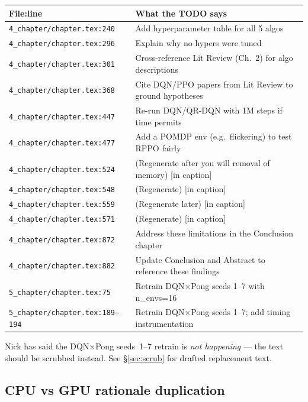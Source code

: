 \documentclass[11pt,a4paper]{article}
\newcommand{\fileline}[1]{\texttt{\small #1}}
\begin{document}
\begin{longtable}{p{4.5cm}p{9.5cm}}
\toprule
File:line & What the TODO says \\
\midrule
\fileline{4\_chapter/chapter.tex:240} & Add hyperparameter table for all 5 algos \\
\fileline{4\_chapter/chapter.tex:296} & Explain why no hypers were tuned \\
\fileline{4\_chapter/chapter.tex:301} & Cross-reference Lit Review (Ch.~2) for algo descriptions \\
\fileline{4\_chapter/chapter.tex:368} & Cite DQN/PPO papers from Lit Review to ground hypotheses \\
\fileline{4\_chapter/chapter.tex:447} & Re-run DQN/QR-DQN with 1M steps if time permits \\
\fileline{4\_chapter/chapter.tex:477} & Add a POMDP env (e.g.~flickering) to test RPPO fairly \\
\fileline{4\_chapter/chapter.tex:524} & (Regenerate after you will removal of memory) [in caption] \\
\fileline{4\_chapter/chapter.tex:548} & (Regenerate) [in caption] \\
\fileline{4\_chapter/chapter.tex:559} & (Regenerate later) [in caption] \\
\fileline{4\_chapter/chapter.tex:571} & (Regenerate) [in caption] \\
\fileline{4\_chapter/chapter.tex:872} & Address these limitations in the Conclusion chapter \\
\fileline{4\_chapter/chapter.tex:882} & Update Conclusion and Abstract to reference these findings \\
\fileline{5\_chapter/chapter.tex:75}  & Retrain DQN$\times$Pong seeds 1--7 with n\_envs=16 \\
\fileline{5\_chapter/chapter.tex:189--194} & Retrain DQN$\times$Pong seeds 1--7; add timing instrumentation \\
\bottomrule
\end{longtable}

Nick has said the DQN$\times$Pong seeds~1--7 retrain is \emph{not happening}
--- the text should be scrubbed instead. See \S\ref{sec:scrub} for drafted
replacement text.

\subsection*{CPU vs GPU rationale duplication}
\end{document}
